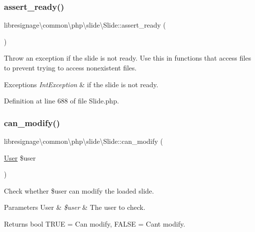 \subsubsection{\texorpdfstring{assert\+\_\+ready()}{assert\_ready()}}
{\footnotesize\ttfamily libresignage\textbackslash{}common\textbackslash{}php\textbackslash{}slide\textbackslash{}\+Slide\+::assert\+\_\+ready (\begin{DoxyParamCaption}{ }\end{DoxyParamCaption})\hspace{0.3cm}{\ttfamily [private]}}

Throw an exception if the slide is not ready. Use this in functions that access files to prevent trying to access nonexistent files.


\begin{DoxyExceptions}{Exceptions}
{\em Int\+Exception} & if the slide is not ready. \\
\hline
\end{DoxyExceptions}


Definition at line 688 of file Slide.\+php.

\mbox{\label{classlibresignage_1_1common_1_1php_1_1slide_1_1Slide_aa9616c19d59570ab081cd1e0bdd66600}} 
\subsubsection{\texorpdfstring{can\+\_\+modify()}{can\_modify()}}
{\footnotesize\ttfamily libresignage\textbackslash{}common\textbackslash{}php\textbackslash{}slide\textbackslash{}\+Slide\+::can\+\_\+modify (\begin{DoxyParamCaption}\item[{\hyperlink{classlibresignage_1_1common_1_1php_1_1auth_1_1User}{User}}]{\$user }\end{DoxyParamCaption})}

Check whether \$user can modify the loaded slide.


\begin{DoxyParams}[1]{Parameters}
User & {\em \$user} & The user to check. \\
\hline
\end{DoxyParams}
\begin{DoxyReturn}{Returns}
bool T\+R\+UE = Can modify, F\+A\+L\+SE = Can\textquotesingle{}t modify. 
\end{DoxyReturn}


